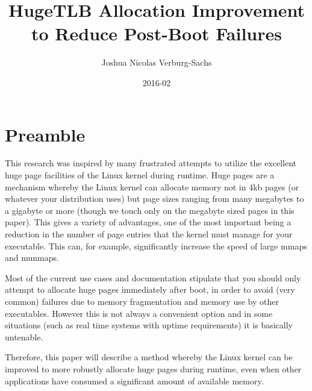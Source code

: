 \documentclass{article}
\title{HugeTLB Allocation Improvement to Reduce Post-Boot Failures}
\date{2016-02}
\author{Joshua Nicolas Verburg-Sachs}
\begin{document}
	\maketitle
	\newpage
	\section{Preamble}
		This research was inspired by many frustrated attempts to utilize the excellent huge page facilities of the Linux kernel during runtime. Huge pages are a mechanism whereby the Linux kernel can allocate memory not in 4kb pages (or whatever your distribution uses) but page sizes ranging from many megabytes to a gigabyte or more (though we touch only on the megabyte sized pages in this paper). This gives a variety of advantages, one of the most important being a reduction in the number of page entries that the kernel must manage for your executable. This can, for example, significantly increase the speed of large mmaps and munmaps.

Most of the current use cases and documentation stipulate that you should only attempt to allocate huge pages immediately after boot, in order to avoid (very common) failures due to memory fragmentation and memory use by other executables. However this is not always a convenient option and in some situations (such as real time systems with uptime requirements) it is basically untenable.

Therefore, this paper will describe a method whereby the Linux kernel can be improved to more robustly allocate huge pages during runtime, even when other applications have consumed a significant amount of available memory.
\end{document}
